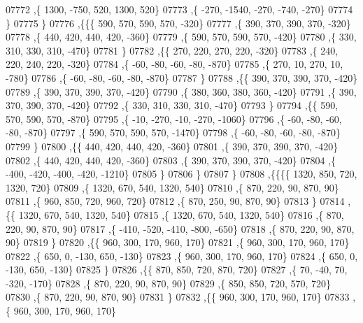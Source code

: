 \begin{DoxyCode}
07772     ,\{  1300,  -750,   520,  1300,   520\}
07773     ,\{  -270, -1540,  -270,  -740,  -270\}
07774     \}
07775    \}
07776   ,\{\{\{   590,   570,   590,   570,  -320\}
07777     ,\{   390,   370,   390,   370,  -320\}
07778     ,\{   440,   420,   440,   420,  -360\}
07779     ,\{   590,   570,   590,   570,  -420\}
07780     ,\{   330,   310,   330,   310,  -470\}
07781     \}
07782    ,\{\{   270,   220,   270,   220,  -320\}
07783     ,\{   240,   220,   240,   220,  -320\}
07784     ,\{   -60,   -80,   -60,   -80,  -870\}
07785     ,\{   270,    10,   270,    10,  -780\}
07786     ,\{   -60,   -80,   -60,   -80,  -870\}
07787     \}
07788    ,\{\{   390,   370,   390,   370,  -420\}
07789     ,\{   390,   370,   390,   370,  -420\}
07790     ,\{   380,   360,   380,   360,  -420\}
07791     ,\{   390,   370,   390,   370,  -420\}
07792     ,\{   330,   310,   330,   310,  -470\}
07793     \}
07794    ,\{\{   590,   570,   590,   570,  -870\}
07795     ,\{   -10,  -270,   -10,  -270, -1060\}
07796     ,\{   -60,   -80,   -60,   -80,  -870\}
07797     ,\{   590,   570,   590,   570, -1470\}
07798     ,\{   -60,   -80,   -60,   -80,  -870\}
07799     \}
07800    ,\{\{   440,   420,   440,   420,  -360\}
07801     ,\{   390,   370,   390,   370,  -420\}
07802     ,\{   440,   420,   440,   420,  -360\}
07803     ,\{   390,   370,   390,   370,  -420\}
07804     ,\{  -400,  -420,  -400,  -420, -1210\}
07805     \}
07806    \}
07807   \}
07808  ,\{\{\{\{  1320,   850,   720,  1320,   720\}
07809     ,\{  1320,   670,   540,  1320,   540\}
07810     ,\{   870,   220,    90,   870,    90\}
07811     ,\{   960,   850,   720,   960,   720\}
07812     ,\{   870,   250,    90,   870,    90\}
07813     \}
07814    ,\{\{  1320,   670,   540,  1320,   540\}
07815     ,\{  1320,   670,   540,  1320,   540\}
07816     ,\{   870,   220,    90,   870,    90\}
07817     ,\{  -410,  -520,  -410,  -800,  -650\}
07818     ,\{   870,   220,    90,   870,    90\}
07819     \}
07820    ,\{\{   960,   300,   170,   960,   170\}
07821     ,\{   960,   300,   170,   960,   170\}
07822     ,\{   650,     0,  -130,   650,  -130\}
07823     ,\{   960,   300,   170,   960,   170\}
07824     ,\{   650,     0,  -130,   650,  -130\}
07825     \}
07826    ,\{\{   870,   850,   720,   870,   720\}
07827     ,\{    70,   -40,    70,  -320,  -170\}
07828     ,\{   870,   220,    90,   870,    90\}
07829     ,\{   850,   850,   720,   570,   720\}
07830     ,\{   870,   220,    90,   870,    90\}
07831     \}
07832    ,\{\{   960,   300,   170,   960,   170\}
07833     ,\{   960,   300,   170,   960,   170\}

\end{DoxyCode}
